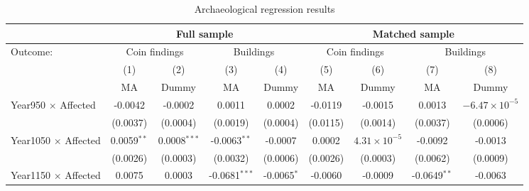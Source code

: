 \documentclass[11pt]{article}
\begin{document}
\begin{landscape}
\begin{table}
\centering
\caption{\label{tab:arch1} Archaeological regression results}
\footnotesize
\begin{tabular}{lcccccccc}
   \tabularnewline \midrule \midrule
                                                    & \multicolumn{4}{c}{Full sample}                                                    & \multicolumn{4}{c}{Matched sample} \\
   \midrule
   Outcome:                                         & \multicolumn{2}{c}{Coin findings} & \multicolumn{2}{c}{Buildings}                  & \multicolumn{2}{c}{Coin findings}               & \multicolumn{2}{c}{Buildings}\\
                                                    & (1)             & (2)             & (3)                   & (4)                    & (5)                    & (6)                    & (7)            & (8)\\  
                                                    & MA              & Dummy           & MA                    & Dummy                  & MA                     & Dummy                  & MA             & Dummy \\ 
   \midrule
   Year950 $\times$ Affected                        & -0.0042         & -0.0002         & 0.0011                & 0.0002                 & -0.0119                & -0.0015                & 0.0013         & $-6.47\times 10^{-5}$\\    
                                                    & (0.0037)        & (0.0004)        & (0.0019)              & (0.0004)               & (0.0115)               & (0.0014)               & (0.0037)       & (0.0006)\\   
   Year1050 $\times$ Affected                       & 0.0059$^{**}$   & 0.0008$^{***}$  & -0.0063$^{**}$        & -0.0007                & 0.0002                 & $4.31\times 10^{-5}$   & -0.0092        & -0.0013\\   
                                                    & (0.0026)        & (0.0003)        & (0.0032)              & (0.0006)               & (0.0026)               & (0.0003)               & (0.0062)       & (0.0009)\\   
   Year1150 $\times$ Affected                       & 0.0075          & 0.0003          & -0.0681$^{***}$       & -0.0065$^{*}$          & -0.0060                & -0.0009                & -0.0649$^{**}$ & -0.0063\\   

\end{tabular}
\end{table}
\end{landscape}
\end{document}
